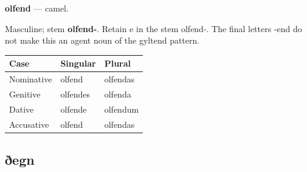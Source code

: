 \par\begin{minipage}{\linewidth}\raggedright
\textbf{olfend} — camel.

Masculine; stem \textbf{olfend-}. Retain e in the stem olfend-. The final letters -end do not make this an agent noun of the gyltend pattern.

\par\begingroup
\fontsize{10.5}{13.2}\selectfont
\setlength{\LTleft}{0pt}\setlength{\LTright}{\fill}
\noindent
\begin{tabular}{@{}>{\raggedright\arraybackslash}p{39.46mm}>{\raggedright\arraybackslash}p{39.46mm}>{\raggedright\arraybackslash}p{39.46mm}@{}}
\toprule
\textbf{Case} & \textbf{Singular} & \textbf{Plural} \\
\midrule
Nominative & olfend & olfendas \\
Genitive & olfendes & olfenda \\
Dative & olfende & olfendum \\
Accusative & olfend & olfendas \\
\bottomrule
\end{tabular}
\par\endgroup

\end{minipage}\par
{}
\subsection*{ðegn}

